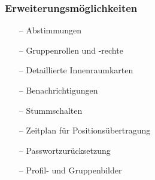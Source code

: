 \documentclass[aspectratio=1610]{beamer}
\begin{document}
\begin{frame}[plain]
\begin{minipage}{0.45\textwidth}
		\end{minipage}
  \end{frame}
  
  
  \begin{frame}[plain]
      \frametitle{\textbf{Erweiterungsmöglichkeiten}}
        \begin{itemize}
          \item[--] Abstimmungen
          \item[--] Gruppenrollen und -rechte
          \item[--] Detaillierte Innenraumkarten
          \item[--] Benachrichtigungen
          \item[--] Stummschalten
          \item[--] Zeitplan für Positionsübertragung
          \item[--] Passwortzurücksetzung
          \item[--] Profil- und Gruppenbilder
        \end{itemize}
  \end{frame}
\end{document}
